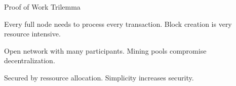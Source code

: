 \documentclass[handout]{beamer}
\begin{document}
	\begin{frame}{Proof of Work Trilemma}
		\begin{center}
			\begin{tikzpicture}[scale=0.6, every node/.style ={scale=0.8}]
				
			\end{tikzpicture}
		\end{center}
		
		\begin{description}[labelwidth=10em]
			\item[\textbf{Scalability}] Every full node needs to process every transaction. Block creation is very resource intensive.
			\item[\textbf{Decentralization}] Open network with many participants. Mining pools compromise decentralization.
			\item[\textbf{Security}] Secured by ressource allocation. Simplicity increases security.
		\end{description}
	\end{frame}
	
\end{document}

